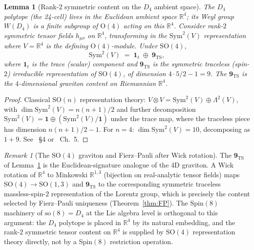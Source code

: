 \documentclass[12pt]{article}
\newtheorem{lemma}[theorem]{Lemma}
\theoremstyle{definition}
\theoremstyle{remark}
\newtheorem{remark}[theorem]{Remark}
\newcommand{\Sym}{\mathrm{Sym}}
\begin{document}
\begin{lemma}[Rank-$2$ symmetric content on the $D_4$ ambient space]\label{lem:spin8-reps}
The $D_4$ polytope (the 24-cell) lives in the Euclidean ambient space $\mathbb{R}^4$; its Weyl group $W(D_4)$ is a finite subgroup of $\mathrm{O}(4)$ acting on this $\mathbb{R}^4$. Consider rank-$2$ symmetric tensor fields $h_{\mu\nu}$ on $\mathbb{R}^4$, transforming in the $\Sym^2(V)$ representation where $V = \mathbb{R}^4$ is the defining $\mathrm{O}(4)$-module. Under $\mathrm{SO}(4)$,
\begin{equation}\label{eq:sym2-R4}
\Sym^2(V) \;=\; \mathbf{1}_t \;\oplus\; \mathbf{9}_{\mathrm{TS}},
\end{equation}
where $\mathbf{1}_t$ is the trace (scalar) component and $\mathbf{9}_{\mathrm{TS}}$ is the symmetric traceless (spin-$2$) irreducible representation of $\mathrm{SO}(4)$, of dimension $4 \cdot 5/2 - 1 = 9$. The $\mathbf{9}_{\mathrm{TS}}$ is the $4$-dimensional graviton content on Riemannian $\mathbb{R}^4$.
\end{lemma}

\begin{proof}
Classical $\mathrm{SO}(n)$ representation theory: $V \otimes V = \Sym^2(V) \oplus \Lambda^2(V)$, with $\dim \Sym^2(V) = n(n+1)/2$ and further decomposition $\Sym^2(V) = \mathbf{1} \oplus (\Sym^2(V) / \mathbf{1})$ under the trace map, where the traceless piece has dimension $n(n+1)/2 - 1$. For $n = 4$: $\dim \Sym^2(V) = 10$, decomposing as $1 + 9$. See~\citep{FultonHarris1991} \S4 or~\citep{Adams1996} Ch.~5.
\end{proof}

\begin{remark}[The $\mathrm{SO}(4)$ graviton and Fierz--Pauli after Wick rotation]\label{rem:spin8-R4}
The $\mathbf{9}_{\mathrm{TS}}$ of Lemma~\ref{lem:spin8-reps} is the Euclidean-signature analogue of the 4D graviton. A Wick rotation of $\mathbb{R}^4$ to Minkowski $\mathbb{R}^{1,3}$ (bijection on real-analytic tensor fields) maps $\mathrm{SO}(4) \to \mathrm{SO}(1,3)$ and $\mathbf{9}_{\mathrm{TS}}$ to the corresponding symmetric traceless massless-spin-$2$ representation of the Lorentz group, which is precisely the content selected by Fierz--Pauli uniqueness (Theorem~\ref{thm:FP}). The $\mathrm{Spin}(8)$ machinery of $\mathrm{so}(8) = D_4$ at the Lie algebra level is orthogonal to this argument: the $D_4$ polytope is placed in $\mathbb{R}^4$ by its natural embedding, and the rank-$2$ symmetric tensor content on $\mathbb{R}^4$ is supplied by $\mathrm{SO}(4)$ representation theory directly, not by a Spin$(8)$ restriction operation.
\end{remark}
\end{document}
